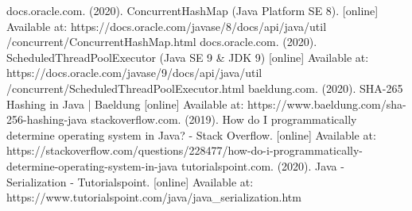 \documentclass[a4paper]{article}
\begin{document}
\begin{thebibliography}{00}
     docs.oracle.com. (2020). ConcurrentHashMap (Java Platform SE 8). [online] Available at: https://docs.oracle.com/javase/8/docs/api/java/util /concurrent/ConcurrentHashMap.html
     docs.oracle.com. (2020). ScheduledThreadPoolExecutor (Java SE 9 \& JDK 9) [online] Available at: https://docs.oracle.com/javase/9/docs/api/java/util /concurrent/ScheduledThreadPoolExecutor.html
     baeldung.com. (2020). SHA-265 Hashing in Java | Baeldung [online] Available at: https://www.baeldung.com/sha-256-hashing-java
     stackoverflow.com. (2019). How do I programmatically determine operating system in Java? - Stack Overflow. [online] Available at: https://stackoverflow.com/questions/228477/how-do-i-programmatically-determine-operating-system-in-java
     tutorialspoint.com. (2020). Java - Serialization - Tutorialspoint. [online] Available at: https://www.tutorialspoint.com/java/java\_serialization.htm
    
\end{thebibliography}
\end{document}
